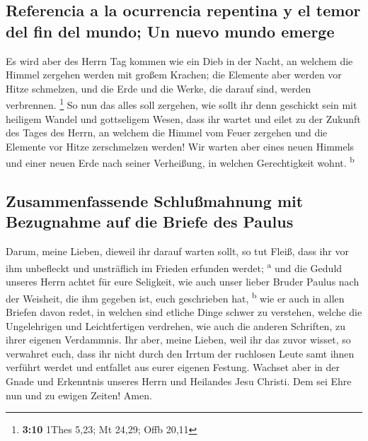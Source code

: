 \hypertarget{referencia-a-la-ocurrencia-repentina-y-el-temor-del-fin-del-mundo-un-nuevo-mundo-emerge}{%
\subsection{Referencia a la ocurrencia repentina y el temor del fin del
mundo; Un nuevo mundo
emerge}\label{referencia-a-la-ocurrencia-repentina-y-el-temor-del-fin-del-mundo-un-nuevo-mundo-emerge}}

 Es wird aber des Herrn Tag kommen wie ein Dieb in der
Nacht, an welchem die Himmel zergehen werden mit großem Krachen; die
Elemente aber werden vor Hitze schmelzen, und die Erde und die Werke,
die darauf sind, werden verbrennen. \footnote{\textbf{3:10} 1Thes 5,23;
  Mt 24,29; Offb 20,11}  So nun das alles soll zergehen,
wie sollt ihr denn geschickt sein mit heiligem Wandel und gottseligem
Wesen,  dass ihr wartet und eilet zu der Zukunft des
Tages des Herrn, an welchem die Himmel vom Feuer zergehen und die
Elemente vor Hitze zerschmelzen werden!  Wir warten aber
eines neuen Himmels und einer neuen Erde nach seiner Verheißung, in
welchen Gerechtigkeit wohnt. \textsuperscript{b}

\hypertarget{zusammenfassende-schluuxdfmahnung-mit-bezugnahme-auf-die-briefe-des-paulus}{%
\subsection{Zusammenfassende Schlußmahnung mit Bezugnahme auf die Briefe
des
Paulus}\label{zusammenfassende-schluuxdfmahnung-mit-bezugnahme-auf-die-briefe-des-paulus}}

 Darum, meine Lieben, dieweil ihr darauf warten sollt, so
tut Fleiß, dass ihr vor ihm unbefleckt und unsträflich im Frieden
erfunden werdet; \textsuperscript{a}  und die Geduld
unseres Herrn achtet für eure Seligkeit, wie auch unser lieber Bruder
Paulus nach der Weisheit, die ihm gegeben ist, euch geschrieben hat,
\textsuperscript{b}  wie er auch in allen Briefen davon
redet, in welchen sind etliche Dinge schwer zu verstehen, welche die
Ungelehrigen und Leichtfertigen verdrehen, wie auch die anderen
Schriften, zu ihrer eigenen Verdammnis.  Ihr aber, meine
Lieben, weil ihr das zuvor wisset, so verwahret euch, dass ihr nicht
durch den Irrtum der ruchlosen Leute samt ihnen verführt werdet und
entfallet aus eurer eigenen Festung.  Wachset aber in der
Gnade und Erkenntnis unseres Herrn und Heilandes Jesu Christi. Dem sei
Ehre nun und zu ewigen Zeiten! Amen.
